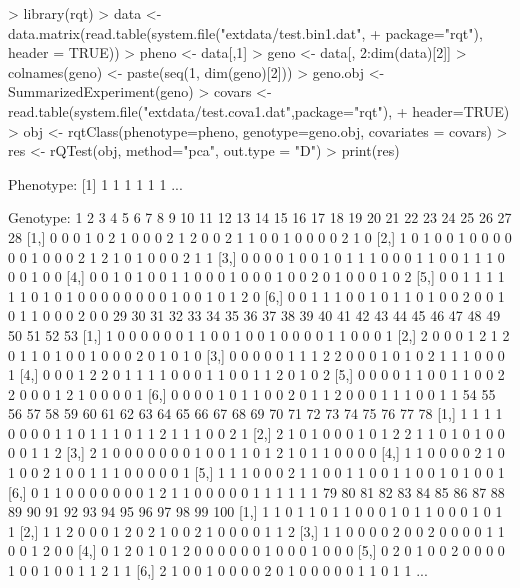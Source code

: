 \documentclass{article}
\begin{document}
\begin{Schunk}
\begin{Sinput}
> library(rqt)
> data <- data.matrix(read.table(system.file("extdata/test.bin1.dat",
+                                            package="rqt"), header = TRUE))
> pheno <- data[,1]
> geno <- data[, 2:dim(data)[2]]
> colnames(geno) <- paste(seq(1, dim(geno)[2]))
> geno.obj <- SummarizedExperiment(geno)
> covars <- read.table(system.file("extdata/test.cova1.dat",package="rqt"), 
+     header=TRUE)
> obj <- rqtClass(phenotype=pheno, genotype=geno.obj, covariates = covars)
> res <- rQTest(obj, method="pca", out.type = "D")
> print(res)
\end{Sinput}
\begin{Soutput}
Phenotype:
[1] 1 1 1 1 1 1
...

Genotype:
     1 2 3 4 5 6 7 8 9 10 11 12 13 14 15 16 17 18 19 20 21 22 23 24 25 26 27 28
[1,] 0 0 0 1 0 2 1 0 0  0  2  1  2  0  0  2  1  1  0  0  1  0  0  0  0  2  1  0
[2,] 1 0 1 0 0 1 0 0 0  0  0  0  1  0  0  0  2  1  2  1  0  1  0  0  0  2  1  1
[3,] 0 0 0 0 1 0 0 1 0  1  1  1  0  0  0  1  1  0  0  1  1  1  0  0  0  1  0  0
[4,] 0 0 1 0 1 0 0 1 1  0  0  0  1  0  0  0  1  0  0  2  0  1  0  0  0  1  0  2
[5,] 0 0 1 1 1 1 1 1 0  1  0  1  0  0  0  0  0  0  0  0  1  0  0  1  0  1  2  0
[6,] 0 0 1 1 1 0 0 1 0  1  1  0  1  0  0  2  0  0  1  0  1  1  0  0  0  2  0  0
     29 30 31 32 33 34 35 36 37 38 39 40 41 42 43 44 45 46 47 48 49 50 51 52 53
[1,]  1  0  0  0  0  0  0  1  1  0  0  1  0  0  1  0  0  0  0  1  1  0  0  0  1
[2,]  2  0  0  0  1  2  1  2  0  1  1  0  1  0  0  1  0  0  0  2  0  1  0  1  0
[3,]  0  0  0  0  0  1  1  1  2  2  0  0  0  1  0  1  0  2  1  1  1  0  0  0  1
[4,]  0  0  0  1  2  2  0  1  1  1  1  0  0  0  1  1  0  0  1  1  2  0  1  0  2
[5,]  0  0  0  0  1  1  0  0  1  1  0  0  2  2  0  0  0  1  2  1  0  0  0  0  1
[6,]  0  0  0  0  1  0  1  1  0  0  2  0  1  1  2  0  0  0  1  1  1  0  0  1  1
     54 55 56 57 58 59 60 61 62 63 64 65 66 67 68 69 70 71 72 73 74 75 76 77 78
[1,]  1  1  1  1  0  0  0  0  1  1  0  1  1  1  0  1  1  2  1  1  1  0  0  2  1
[2,]  2  1  0  1  0  0  0  1  0  1  2  2  1  1  0  1  0  1  0  0  0  0  1  1  2
[3,]  2  1  0  0  0  0  0  0  0  1  0  0  1  1  0  1  2  1  0  1  1  0  0  0  0
[4,]  1  1  0  0  0  0  2  1  0  1  0  0  2  1  0  0  1  1  1  0  0  0  0  0  1
[5,]  1  1  1  0  0  0  2  1  1  0  0  1  1  0  0  1  1  0  0  1  0  1  0  0  1
[6,]  0  1  1  0  0  0  0  0  0  0  1  2  1  1  0  0  0  0  0  1  1  1  1  1  1
     79 80 81 82 83 84 85 86 87 88 89 90 91 92 93 94 95 96 97 98 99 100
[1,]  1  1  0  1  1  0  1  1  0  0  0  1  0  1  1  0  0  0  1  0  1   1
[2,]  1  1  2  0  0  0  1  2  0  2  1  0  0  2  1  0  0  0  0  1  1   2
[3,]  1  1  0  0  0  0  2  0  0  2  0  0  0  0  1  1  0  0  1  2  0   0
[4,]  0  1  2  0  1  0  1  2  0  0  0  0  0  0  1  0  0  0  1  0  0   0
[5,]  0  2  0  1  0  0  2  0  0  0  0  1  0  0  1  0  0  1  1  2  1   1
[6,]  2  1  0  0  1  0  0  0  0  2  0  1  0  0  0  0  0  1  1  0  1   1
...


\end{Soutput}
\end{Schunk}
\end{document}

